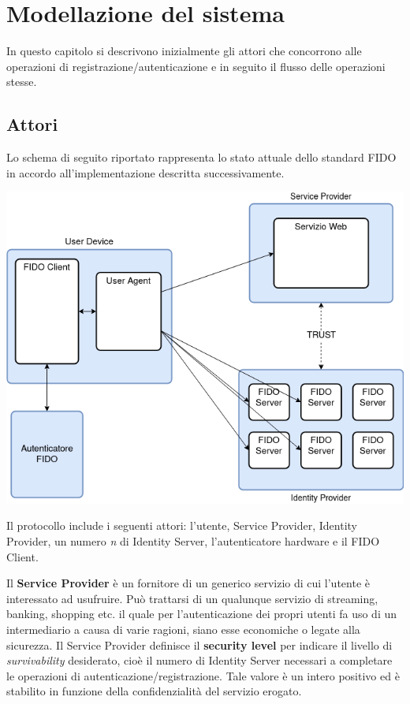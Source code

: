 \chapter{Modellazione del sistema}
\label{modellazione}

In questo capitolo si descrivono inizialmente gli attori che concorrono alle operazioni di registrazione/autenticazione e in seguito il flusso delle operazioni stesse.

\section{Attori}
\label{attori}

Lo schema di seguito riportato rappresenta lo stato attuale dello standard FIDO in accordo all'implementazione descritta successivamente.
\begin{center}
	\includegraphics[width=.8\columnwidth]{figures/attori.png}
	\label{fig:attori}
\end{center}


Il protocollo include i seguenti attori: l'utente, Service Provider, Identity Provider, un numero \emph{n} di Identity Server, l'autenticatore hardware e il FIDO Client. 

Il \textbf{Service Provider} è un fornitore di un generico servizio di cui l'utente è interessato ad usufruire. Può trattarsi di un qualunque servizio di streaming, banking, shopping etc. il quale per l'autenticazione dei propri utenti fa uso di un intermediario a causa di varie ragioni, siano esse economiche o legate alla sicurezza. 
Il Service Provider definisce il \textbf{security level} per indicare il livello di \emph{survivability} desiderato, cioè il numero di Identity Server necessari a completare le operazioni di autenticazione/registrazione. Tale valore è un intero positivo ed è stabilito in funzione della confidenzialità del servizio erogato.

